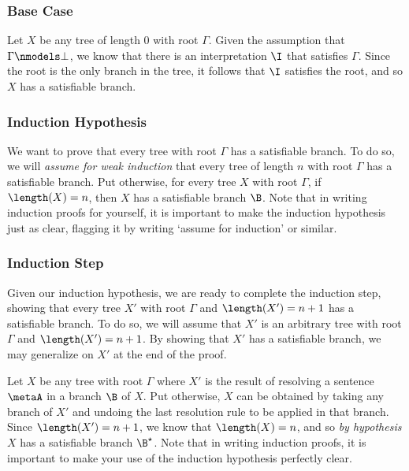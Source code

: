 \subsubsection{Base Case}

Let $X$ be any tree of length $0$ with root $\Gamma$.
Given the assumption that $\Gamma \nmodels \bot$, we know that there is an interpretation $\I$ that satisfies $\Gamma$.
Since the root is the only branch in the tree, it follows that $\I$ satisfies the root, and so $X$ has a satisfiable branch. 





\subsubsection{Induction Hypothesis}

We want to prove that every tree with root $\Gamma$ has a satisfiable branch.
To do so, we will \textit{assume for weak induction} that every tree of length $n$ with root $\Gamma$ has a satisfiable branch. 
Put otherwise, for every tree $X$ with root $\Gamma$, if $\length(X) = n$, then $X$ has a satisfiable branch $\B$. 
Note that in writing induction proofs for yourself, it is important to make the induction hypothesis just as clear, flagging it by writing `assume for induction' or similar.



\subsubsection{Induction Step}

Given our induction hypothesis, we are ready to complete the induction step, showing that every tree $X'$ with root $\Gamma$ and $\length(X')=n+1$ has a satisfiable branch.
To do so, we will assume that $X'$ is an arbitrary tree with root $\Gamma$ and $\length(X')=n+1$.
By showing that $X'$ has a satisfiable branch, we may generalize on $X'$ at the end of the proof.

Let $X$ be any tree with root $\Gamma$ where $X'$ is the result of resolving a sentence $\metaA$ in a branch $\B$ of $X$.
Put otherwise, $X$ can be obtained by taking any branch of $X'$ and undoing the last resolution rule to be applied in that branch. 
Since $\length(X')=n+1$, we know that $\length(X)=n$, and so \textit{by hypothesis} $X$ has a satisfiable branch $\B^\star$. 
Note that in writing induction proofs, it is important to make your use of the induction hypothesis perfectly clear.

